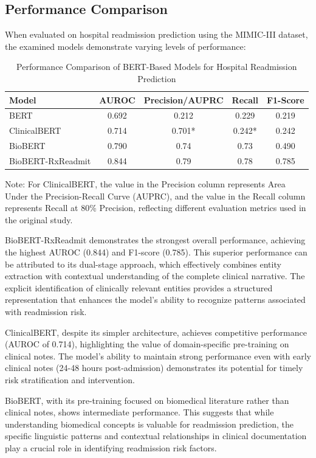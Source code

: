 \documentclass[3p,times,procedia]{elsarticle}
\begin{document}
\subsection{Performance Comparison}

When evaluated on hospital readmission prediction using the MIMIC-III dataset, the examined models demonstrate varying levels of performance:

\begin{table}[h]
\centering
\caption{Performance Comparison of BERT-Based Models for Hospital Readmission Prediction}
\label{tab:performance_comparison}
\begin{tabular}{|l|c|c|c|c|}
\hline
\textbf{Model} & \textbf{AUROC} & \textbf{Precision/AUPRC} & \textbf{Recall} & \textbf{F1-Score} \\ \hline
BERT & 0.692 & 0.212 & 0.229 & 0.219 \\ \hline
ClinicalBERT & 0.714 & 0.701* & 0.242* & 0.242 \\ \hline
BioBERT & 0.790 & 0.74 & 0.73 & 0.490 \\ \hline
BioBERT-RxReadmit & 0.844 & 0.79 & 0.78 & 0.785 \\ \hline
\end{tabular}
\end{table}

Note: For ClinicalBERT, the value in the Precision column represents Area Under the Precision-Recall Curve (AUPRC), and the value in the Recall column represents Recall at 80\% Precision, reflecting different evaluation metrics used in the original study.

BioBERT-RxReadmit demonstrates the strongest overall performance, achieving the highest AUROC (0.844) and F1-score (0.785). This superior performance can be attributed to its dual-stage approach, which effectively combines entity extraction with contextual understanding of the complete clinical narrative. The explicit identification of clinically relevant entities provides a structured representation that enhances the model's ability to recognize patterns associated with readmission risk.

ClinicalBERT, despite its simpler architecture, achieves competitive performance (AUROC of 0.714), highlighting the value of domain-specific pre-training on clinical notes. The model's ability to maintain strong performance even with early clinical notes (24-48 hours post-admission) demonstrates its potential for timely risk stratification and intervention.

BioBERT, with its pre-training focused on biomedical literature rather than clinical notes, shows intermediate performance. This suggests that while understanding biomedical concepts is valuable for readmission prediction, the specific linguistic patterns and contextual relationships in clinical documentation play a crucial role in identifying readmission risk factors.
\end{document}
